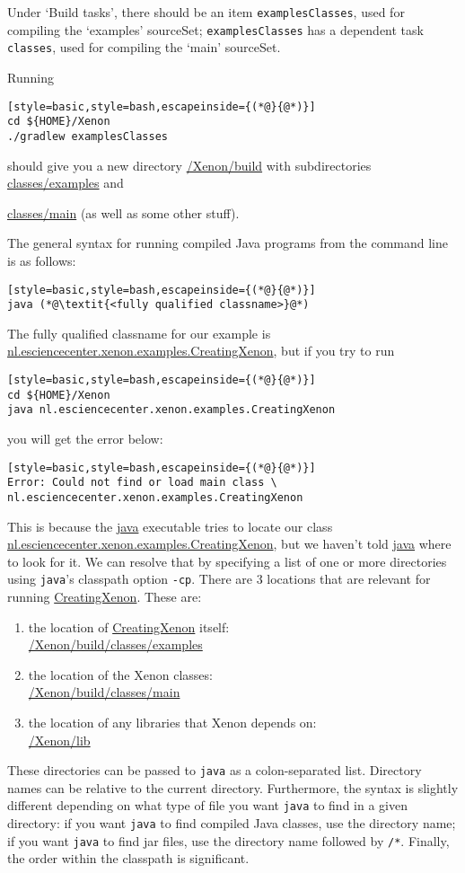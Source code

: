 Under `Build tasks', there should be an item \texttt{examplesClasses}, used for compiling the `examples' sourceSet; \texttt{examplesClasses} has a dependent task \texttt{classes}, used for compiling the `main' sourceSet.

Running
\begin{lstlisting}[style=basic,style=bash,escapeinside={(*@}{@*)}]
cd ${HOME}/Xenon
./gradlew examplesClasses
\end{lstlisting} %
should give you a new directory \mytilde\url{/Xenon/build} with subdirectories \url{classes/examples} and {\url{classes/main} (as well as some other stuff).


The general syntax for running compiled Java programs from the command line is as follows:
\begin{lstlisting}[style=basic,style=bash,escapeinside={(*@}{@*)}]
java (*@\textit{<fully qualified classname>}@*)
\end{lstlisting}
The fully qualified classname for our example is \url{nl.esciencecenter.xenon.examples.CreatingXenon}, but if you try to run
\begin{lstlisting}[style=basic,style=bash,escapeinside={(*@}{@*)}]
cd ${HOME}/Xenon
java nl.esciencecenter.xenon.examples.CreatingXenon
\end{lstlisting} %
you will get the error below:
\begin{lstlisting}[style=basic,style=bash,escapeinside={(*@}{@*)}]
Error: Could not find or load main class \
nl.esciencecenter.xenon.examples.CreatingXenon
\end{lstlisting}

This is because the \url{java} executable tries to locate our class \url{nl.esciencecenter.xenon.examples.CreatingXenon}, but we haven't told \url{java} where to look for it. We can resolve that by specifying a list of one or more directories using \texttt{java}'s classpath option \texttt{-cp}. There are 3 locations that are relevant for running \url{CreatingXenon}. These are:
\begin{enumerate}
\item{the location of \url{CreatingXenon} itself:\\ \mytilde\url{/Xenon/build/classes/examples}}
\item{the location of the Xenon classes:\\ \mytilde\url{/Xenon/build/classes/main}}
\item{the location of any libraries that Xenon depends on:\\ \mytilde\url{/Xenon/lib}}
\end{enumerate}
These directories can be passed to \texttt{java} as a colon-separated list. Directory names can be relative to the current directory. Furthermore, the syntax is slightly different depending on what type of file you want \texttt{java} to find in a given directory: if you want \texttt{java} to find compiled Java classes, use the directory name; if you want \texttt{java} to find jar files, use the directory name followed by \texttt{/*}. Finally, the order within the classpath is significant.

}
